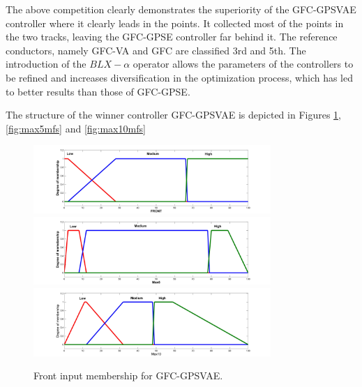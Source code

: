 \documentclass[10pt,journal,compsoc]{IEEEtran}
\begin{document}
The above competition clearly demonstrates the superiority of the {\sf GFC-GPSVAE} controller where it clearly leads in the points. It collected most of the points in the two tracks, leaving the {\sf GFC-GPSE} controller far behind it. The reference conductors, namely {\sf GFC-VA} and {\sf GFC}  are classified 3rd and 5th.
The introduction of the $BLX-\alpha$ operator allows the parameters of the controllers to be refined and  increases diversification in the optimization process, which has led to better results than those of {\sf GFC-GPSE}.

The structure of the winner controller {\sf GFC-GPSVAE} is depicted in Figures \ref{fig:frontmfs}, \ref{fig:max5mfs} and \ref{fig:max10mfs}

\begin{figure}[!ht]	
	\begin{center}
		\includegraphics[width=9cm]{fig/FRONT.jpg}
		\includegraphics[width=9cm]{fig/MAX5.jpg}
		\includegraphics[width=9cm]{fig/MAX10.jpg}		
		\caption{Front input membership for 
			{\sf GFC-GPSVAE}.}
		\label{fig:frontmfs}	
	\end{center}	
\end{figure}
\end{document}
